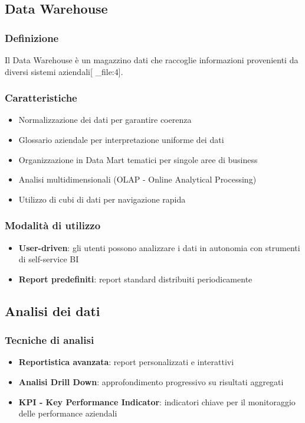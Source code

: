 \documentclass[12pt,a4paper]{article}
\begin{document}
\subsection{Data Warehouse}

\subsubsection{Definizione}
Il Data Warehouse è un magazzino dati che raccoglie informazioni provenienti da diversi sistemi aziendali[ _file:4].

\subsubsection{Caratteristiche}
\begin{itemize}
    \item Normalizzazione dei dati per garantire coerenza
    \item Glossario aziendale per interpretazione uniforme dei dati
    \item Organizzazione in Data Mart tematici per singole aree di business
    \item Analisi multidimensionali (OLAP - Online Analytical Processing)
    \item Utilizzo di cubi di dati per navigazione rapida
\end{itemize}

\subsubsection{Modalità di utilizzo}
\begin{itemize}
    \item \textbf{User-driven}: gli utenti possono analizzare i dati in autonomia con strumenti di self-service BI
    \item \textbf{Report predefiniti}: report standard distribuiti periodicamente
\end{itemize}

\subsection{Analisi dei dati}

\subsubsection{Tecniche di analisi}
\begin{itemize}
    \item \textbf{Reportistica avanzata}: report personalizzati e interattivi
    \item \textbf{Analisi Drill Down}: approfondimento progressivo su risultati aggregati
    \item \textbf{KPI - Key Performance Indicator}: indicatori chiave per il monitoraggio delle performance aziendali
\end{itemize}
\end{document}
